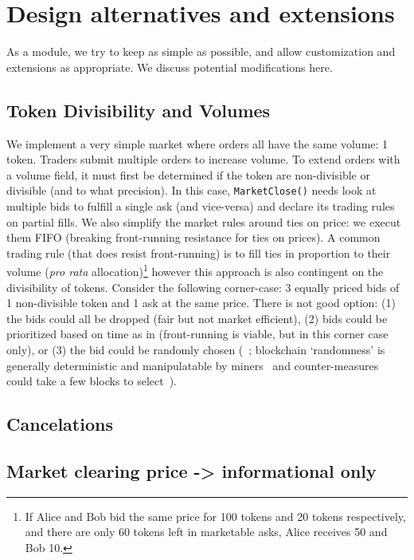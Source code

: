 \section{Design alternatives and extensions}

As a module, we try to keep \cm as simple as possible, and allow customization and extensions as appropriate. We discuss potential modifications here.  

\subsection{Token Divisibility and Volumes} 

We implement a very simple market where orders all have the same volume: 1 token. Traders submit multiple orders to increase volume. To extend orders with a volume field, it must first be determined if the token are non-divisible or divisible (and to what precision). In this case, \texttt{MarketClose()} needs look at multiple bids to fulfill a single ask (and vice-versa) and declare its trading rules on partial fills. We also simplify the market rules around ties on price: we execut them FIFO (breaking front-running resistance for ties on prices). A common trading rule (that does resist front-running) is to fill ties in proportion to their volume (\ie \textit{pro rata} allocation)\footnote{If Alice and Bob bid the same price for 100 tokens and 20 tokens respectively, and there are only 60 tokens left in marketable asks, Alice receives 50 and Bob 10.} however this approach is also contingent on the divisibility of tokens. Consider the following corner-case: 3 equally priced bids of 1 non-divisible token and 1 ask at the same price. There is not good option: (1) the bids could all be dropped (fair but not market efficient), (2) bids could be prioritized based on time as in \cm (front-running is viable, but in this corner case only), or (3) the bid could be randomly chosen (\cf~\cite{mavroudis2019libra}; blockchain `randomness' is generally deterministic and manipulatable by miners~\cite{bonneau2015random,buenz2017proofs} and counter-measures could take a few blocks to select~\cite{boneh2018verifiable}).

\subsection{Cancelations}




\subsection{Market clearing price -> informational only}


